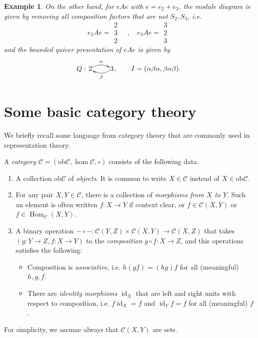 \documentclass[11pt,a4paper]{article}
\numberwithin{equation}{section}
\theoremstyle{all}
\newtheorem{example}[theorem]{Example}
\theoremstyle{remark}
\newcommand{\CC}{\mathcal{C}}
\newcommand{\id}{\operatorname{id}}
\newcommand{\Hom}{\operatorname{Hom}\nolimits}
\newcommand{\defn}[1]{\textsl{\color{darkblue} #1}}
\begin{document}
\begin{example}
On the other hand, for $eAe$ with $e=e_2+e_3$, the module diagram is given by removing all composition factors that are not $S_2, S_3$, i.e.
\[
e_2Ae = \begin{smallmatrix}
2 \\ 3 \\2 \end{smallmatrix} \quad,\quad 
e_3Ae = \begin{smallmatrix}
3 \\ 2 \\ 3
\end{smallmatrix}
\]
and the bounded quiver presentation of $eAe$ is given by 
\[
Q: \xymatrix@1{ 2 \ar@/^/[r]^{\alpha} & 3 \ar@/^/[l]^{\beta} },  \qquad I=(\alpha\beta\alpha, \beta\alpha\beta).
\]
\end{example}
\fi

\pagebreak 

\section{Some basic category theory}

We briefly recall some language from category theory that are commonly used in representation theory.

\medskip

A \defn{category} $\CC=(\mathrm{ob}\CC,\hom\CC,\circ)$ consists of the following data.
\begin{enumerate}
\item A collection $\mathrm{ob}\CC$ of \defn{objects}.  It is common to write $X\in \CC$ instead of $X\in \mathrm{ob}\CC$.

\item For any pair $X,Y\in \CC$, there is a collection of \defn{morphisms from $X$ to $Y$}.  Such an element is often written $f:X\to Y$ if context clear, or $f\in \CC(X,Y)$ or $f\in\Hom_\CC(X,Y)$.

\item A binary operation $-\circ -: \CC(Y,Z)\times \CC(X,Y)\to \CC(X,Z)$ that takes $(g:Y\to Z, f:X\to Y)$ to the  \defn{composition} $g\circ f : X\to Z$, and this operations satisfies the following:

\begin{itemize}
\item Composition is \defn{associative}, i.e. $h(gf)=(hg)f$ for all (meaningful) $h,g,f$.

\item There are \defn{identity morphisms} $\id_X$ that are left and right units with respect to composition, i.e. $f\id_X=f$ and $\id_Yf=f$ for all (meaningful) $f$.
\end{itemize}
\end{enumerate}
For simplicity, we assume always that $\CC(X,Y)$ are sets.
\end{document}
